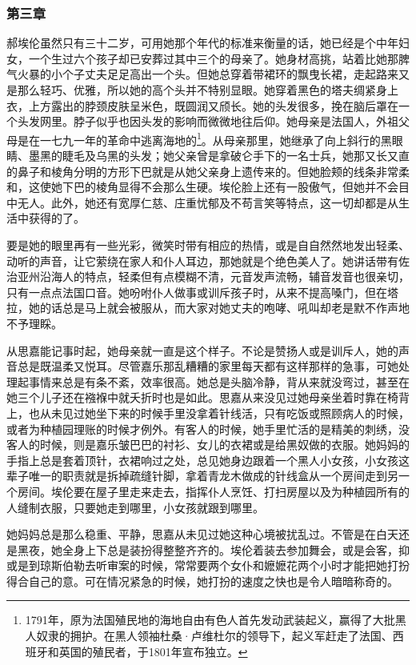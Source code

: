 \subsubsection{第三章}

\par 郝埃伦虽然只有三十二岁，可用她那个年代的标准来衡量的话，她已经是个中年妇女，一个生过六个孩子却已安葬过其中三个的母亲了。她身材高挑，站着比她那脾气火暴的小个子丈夫足足高出一个头。但她总穿着带裙环的飘曳长裙，走起路来又是那么轻巧、优雅，所以她的高个头并不特别显眼。她穿着黑色的塔夫绸紧身上衣，上方露出的脖颈皮肤呈米色，既圆润又颀长。她的头发很多，挽在脑后罩在一个头发网里。脖子似乎也因头发的影响而微微地往后仰。她母亲是法国人，外祖父母是在一七九一年的革命中逃离海地的\footnote{1791年，原为法国殖民地的海地自由有色人首先发动武装起义，赢得了大批黑人奴隶的拥护。在黑人领袖杜桑·卢维杜尔的领导下，起义军赶走了法国、西班牙和英国的殖民者，于1801年宣布独立。}。从母亲那里，她继承了向上斜行的黑眼睛、墨黑的睫毛及乌黑的头发；她父亲曾是拿破仑手下的一名士兵，她那又长又直的鼻子和棱角分明的方形下巴就是从她父亲身上遗传来的。但她脸颊的线条非常柔和，这使她下巴的棱角显得不会那么生硬。埃伦脸上还有一股傲气，但她并不会目中无人。此外，她还有宽厚仁慈、庄重忧郁及不苟言笑等特点，这一切却都是从生活中获得的了。
\par 要是她的眼里再有一些光彩，微笑时带有相应的热情，或是自自然然地发出轻柔、动听的声音，让它萦绕在家人和仆人耳边，那她就是个绝色美人了。她讲话带有佐治亚州沿海人的特点，轻柔但有点模糊不清，元音发声流畅，辅音发音也很亲切，只有一点点法国口音。她吩咐仆人做事或训斥孩子时，从来不提高嗓门，但在塔拉，她的话总是马上就会被服从，而大家对她丈夫的咆哮、吼叫却老是默不作声地不予理睬。
\par 从思嘉能记事时起，她母亲就一直是这个样子。不论是赞扬人或是训斥人，她的声音总是既温柔又悦耳。尽管嘉乐那乱糟糟的家里每天都有这样那样的急事，可她处理起事情来总是有条不紊，效率很高。她总是头脑冷静，背从来就没弯过，甚至在她三个儿子还在襁褓中就夭折时也是如此。思嘉从来没见过她母亲坐着时靠在椅背上，也从未见过她坐下来的时候手里没拿着针线活，只有吃饭或照顾病人的时候，或者为种植园理账的时候才例外。有客人的时候，她手里忙活的是精美的刺绣，没客人的时候，则是嘉乐皱巴巴的衬衫、女儿的衣裙或是给黑奴做的衣服。她妈妈的手指上总是套着顶针，衣裙响过之处，总见她身边跟着一个黑人小女孩，小女孩这辈子唯一的职责就是拆掉疏缝针脚，拿着青龙木做成的针线盒从一个房间走到另一个房间。埃伦要在屋子里走来走去，指挥仆人烹饪、打扫房屋以及为种植园所有的人缝制衣服，只要她走到哪里，小女孩就跟到哪里。
\par 她妈妈总是那么稳重、平静，思嘉从未见过她这种心境被扰乱过。不管是在白天还是黑夜，她全身上下总是装扮得整整齐齐的。埃伦着装去参加舞会，或是会客，抑或是到琼斯伯勒去听审案的时候，常常要两个女仆和嬷嬷花两个小时才能把她打扮得合自己的意。可在情况紧急的时候，她打扮的速度之快也是令人暗暗称奇的。
